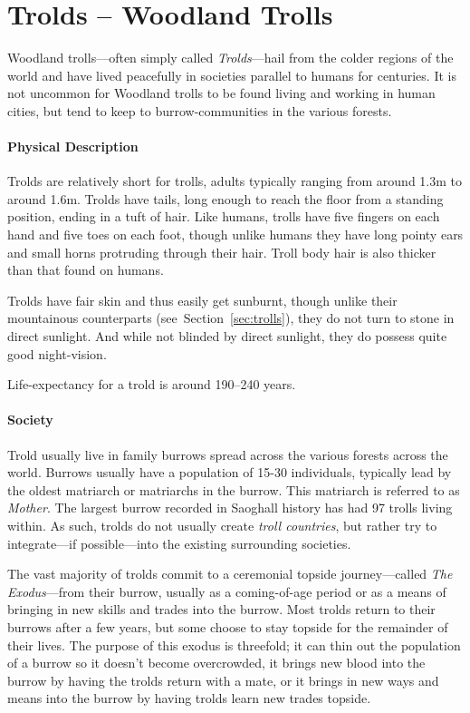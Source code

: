 \section{Trolds -- Woodland Trolls}
Woodland trolls---often simply called \textit{Trolds}---hail from the colder regions of the world and have lived peacefully in societies parallel to humans for centuries.
It is not uncommon for Woodland trolls to be found living and working in human cities, but tend to keep to burrow-communities in the various forests.

\paragraph{Physical Description}
Trolds are relatively short for trolls, adults typically ranging from around 1.3m to around 1.6m.
Trolds have tails, long enough to reach the floor from a standing position, ending in a tuft of hair.
Like humans, trolls have five fingers on each hand and five toes on each foot, though unlike humans they have long pointy ears and small horns protruding through their hair.
Troll body hair is also thicker than that found on humans.

Trolds have fair skin and thus easily get sunburnt, though unlike their mountainous counterparts (see~Section~\ref{sec:trolls}), they do not turn to stone in direct sunlight.
And while not blinded by direct sunlight, they do possess quite good night-vision.

Life-expectancy for a trold is around 190--240 years.

\paragraph{Society}
Trold usually live in family burrows spread across the various forests across the world.
Burrows usually have a population of 15-30 individuals, typically lead by the oldest matriarch or matriarchs in the burrow. 
This matriarch is referred to as \textit{Mother}.
The largest burrow recorded in Saoghall history has had 97 trolls living within.
As such, trolds do not usually create \textit{troll countries}, but rather try to integrate---if possible---into the existing surrounding societies.

The vast majority of trolds commit to a ceremonial topside journey---called \textit{The Exodus}---from their burrow, usually as a coming-of-age period or as a means of bringing in new skills and trades into the burrow.
Most trolds return to their burrows after a few years, but some choose to stay topside for the remainder of their lives.
The purpose of this exodus is threefold; it can thin out the population of a burrow so it doesn't become overcrowded, it brings new blood into the burrow by having the trolds return with a mate, or it brings in new ways and means into the burrow by having trolds learn new trades topside.

